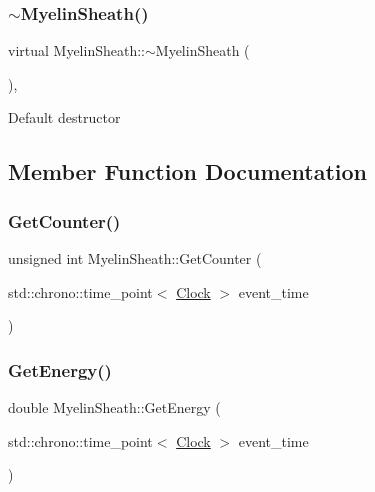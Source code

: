 \mbox{\label{classMyelinSheath_acf71a2a450e2df353f28eed6c7a4129a}} 
\subsubsection{\texorpdfstring{$\sim$\+Myelin\+Sheath()}{~MyelinSheath()}}
{\footnotesize\ttfamily virtual Myelin\+Sheath\+::$\sim$\+Myelin\+Sheath (\begin{DoxyParamCaption}{ }\end{DoxyParamCaption})\hspace{0.3cm}{\ttfamily [inline]}, {\ttfamily [virtual]}}

Default destructor 

\subsection{Member Function Documentation}
\mbox{\label{classMyelinSheath_a10eef8601d129e7e2f28e8ed1ebc975c}} 
\subsubsection{\texorpdfstring{Get\+Counter()}{GetCounter()}}
{\footnotesize\ttfamily unsigned int Myelin\+Sheath\+::\+Get\+Counter (\begin{DoxyParamCaption}\item[{std\+::chrono\+::time\+\_\+point$<$ \mbox{\hyperlink{universe_8h_a0ef8d951d1ca5ab3cfaf7ab4c7a6fd80}{Clock}} $>$}]{event\+\_\+time }\end{DoxyParamCaption})\hspace{0.3cm}{\ttfamily [inline]}}

\mbox{\label{classMyelinSheath_ac0c4142b6066e5982c54583e8ac01271}} 
\subsubsection{\texorpdfstring{Get\+Energy()}{GetEnergy()}}
{\footnotesize\ttfamily double Myelin\+Sheath\+::\+Get\+Energy (\begin{DoxyParamCaption}\item[{std\+::chrono\+::time\+\_\+point$<$ \mbox{\hyperlink{universe_8h_a0ef8d951d1ca5ab3cfaf7ab4c7a6fd80}{Clock}} $>$}]{event\+\_\+time }\end{DoxyParamCaption})\hspace{0.3cm}{\ttfamily [inline]}}

